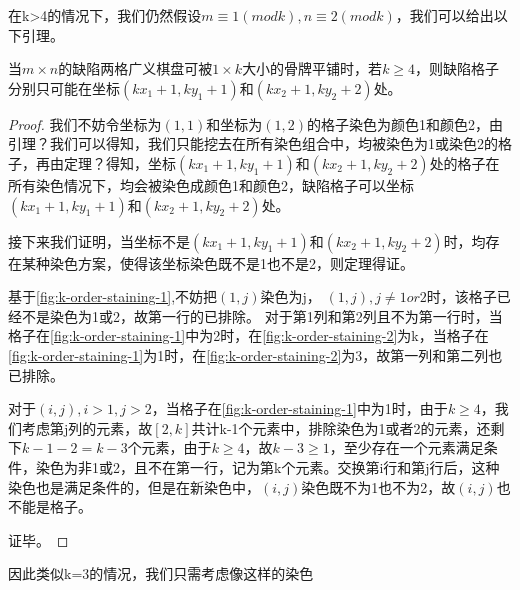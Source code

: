 在k>4的情况下，我们仍然假设$m \equiv 1 (mod k), n \equiv 2 (mod k)$，我们可以给出以下引理。
\begin{theorem}
	\label{basic-theorem-3}
	当$m \times n$的缺陷两格广义棋盘可被$1 \times k$大小的骨牌平铺时，若$k \ge 4$，则缺陷格子分别只可能在坐标$(kx_1 + 1, ky_1 + 1)$和$(kx_2 + 1, ky_2 + 2)$处。
\end{theorem}
\begin{proof}
	我们不妨令坐标为$(1, 1)$和坐标为$(1, 2)$的格子染色为颜色1和颜色2，由引理？我们可以得知，我们只能挖去在所有染色组合中，均被染色为1或染色2的格子，再由定理？得知，坐标$(kx_1 + 1, ky_1 + 1)$和$(kx_2 + 1, ky_2 + 2)$处的格子在所有染色情况下，均会被染色成颜色1和颜色2，缺陷格子可以坐标$(kx_1 + 1, ky_1 + 1)$和$(kx_2 + 1, ky_2 + 2)$处。

	接下来我们证明，当坐标不是$(kx_1 + 1, ky_1 + 1)$和$(kx_2 + 1, ky_2 + 2)$时，均存在某种染色方案，使得该坐标染色既不是1也不是2，则定理得证。



	基于\ref{fig:k-order-staining-1},不妨把$(1, j)$染色为j， $(1, j), j \neq 1 or 2$时，该格子已经不是染色为1或2，故第一行的已排除。
	对于第1列和第2列且不为第一行时，当格子在\ref{fig:k-order-staining-1}中为2时，在\ref{fig:k-order-staining-2}为k，当格子在\ref{fig:k-order-staining-1}为1时，在\ref{fig:k-order-staining-2}为3，故第一列和第二列也已排除。

	对于$(i, j), i > 1, j > 2$，当格子在\ref{fig:k-order-staining-1}中为1时，由于$k \ge 4$，我们考虑第j列的元素，故$[2, k]$共计k-1个元素中，排除染色为1或者2的元素，还剩下$k - 1 - 2 = k-3$个元素，由于$k \ge 4$，故$k-3 \ge 1$，至少存在一个元素满足条件，染色为非1或2，且不在第一行，记为第k个元素。交换第i行和第j行后，这种染色也是满足条件的，但是在新染色中，$(i,j)$染色既不为1也不为2，故$(i, j)$也不能是格子。

	证毕。

\end{proof}


因此类似k=3的情况，我们只需考虑像这样的染色

